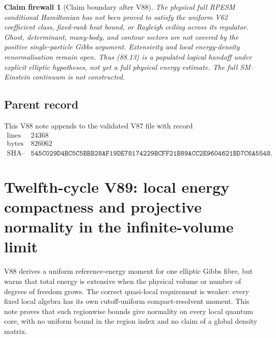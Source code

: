 \documentclass[11pt]{article}
\newtheorem{firewall}[theorem]{Claim firewall}
\theoremstyle{remark}
\begin{document}
\begin{firewall}[Claim boundary after V88]
\label{fire:v12v88-claim}
The physical full RPESM conditional Hamiltonian has not been proved
to satisfy the uniform V62 coefficient class, fixed-rank heat bound,
or Rayleigh ceiling across its regulator.  Ghost, determinant,
many-body, and contour sectors are not covered by the positive
single-particle Gibbs argument.  Extensivity and local energy-density
renormalisation remain open.  Thus (88.13) is a populated logical
handoff under explicit elliptic hypotheses, not yet a full physical
energy estimate.  The full SM--Einstein continuum is not
constructed.
\end{firewall}

\subsection{Parent record}

This V88 note appends to the validated V87 file with record
\[
\begin{array}{c|c}
\text{lines}&24368\\
\text{bytes}&826062\\
\text{SHA--256}&
\texttt{545C029D4BC5C5BBB28AF19DE78174229BCFF21B89ACC2E9604621BD7C6A5548}.
\end{array}
\]



\section{Twelfth-cycle V89: local energy compactness and projective
normality in the infinite-volume limit}
\label{sec:v12v89}

V88 derives a uniform reference-energy moment for one elliptic Gibbs
fibre, but warns that total energy is extensive when the physical
volume or number of degrees of freedom grows.  The correct
quasi-local requirement is weaker: every fixed local algebra has its
own cutoff-uniform compact-resolvent moment.  This note proves that
such regionwise bounds give normality on every local quantum core,
with no uniform bound in the region index and no claim of a global
density matrix.
\end{document}
